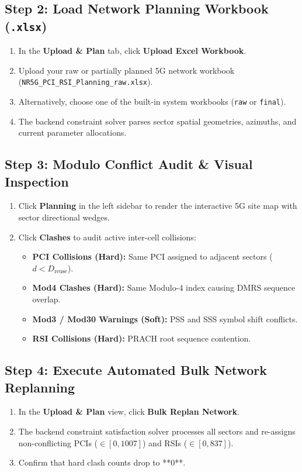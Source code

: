 \documentclass[12pt,a4paper]{article}
\begin{document}
\subsection{Step 2: Load Network Planning Workbook (\texttt{.xlsx})}
\begin{enumerate}
    \item In the \textbf{Upload \& Plan} tab, click \textbf{Upload Excel Workbook}.
    \item Upload your raw or partially planned 5G network workbook (\texttt{NR5G\_PCI\_RSI\_Planning\_raw.xlsx}).
    \item Alternatively, choose one of the built-in system workbooks (\texttt{raw} or \texttt{final}).
    \item The backend constraint solver parses sector spatial geometries, azimuths, and current parameter allocations.
\end{enumerate}

\subsection{Step 3: Modulo Conflict Audit \& Visual Inspection}
\begin{enumerate}
    \item Click \textbf{Planning} in the left sidebar to render the interactive 5G site map with sector directional wedges.
    \item Click \textbf{Clashes} to audit active inter-cell collisions:
    \begin{itemize}
        \item \textbf{PCI Collisions (Hard):} Same PCI assigned to adjacent sectors ($d < D_{\text{reuse}}$).
        \item \textbf{Mod4 Clashes (Hard):} Same Modulo-4 index causing DMRS sequence overlap.
        \item \textbf{Mod3 / Mod30 Warnings (Soft):} PSS and SSS symbol shift conflicts.
        \item \textbf{RSI Collisions (Hard):} PRACH root sequence contention.
    \end{itemize}
\end{enumerate}

\subsection{Step 4: Execute Automated Bulk Network Replanning}
\begin{enumerate}
    \item In the \textbf{Upload \& Plan} view, click \textbf{Bulk Replan Network}.
    \item The backend constraint satisfaction solver processes all sectors and re-assigns non-conflicting PCIs ($\in [0, 1007]$) and RSIs ($\in [0, 837]$).
    \item Confirm that hard clash counts drop to **0**.
\end{enumerate}
\end{document}
